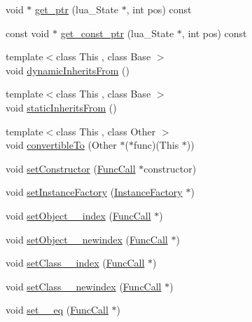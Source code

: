 \begin{DoxyCompactItemize}
\item 
void $\ast$ \hyperlink{classSLB_1_1ClassInfo_a820d5ddf3376aac189aaffbc62e8608d}{get\+\_\+ptr} (lua\+\_\+\+State $\ast$, int pos) const 
\item 
const void $\ast$ \hyperlink{classSLB_1_1ClassInfo_a569fd1f981d5980ea664aa5e0f895903}{get\+\_\+const\+\_\+ptr} (lua\+\_\+\+State $\ast$, int pos) const 
\item 
{\footnotesize template$<$class This , class Base $>$ }\\void \hyperlink{classSLB_1_1ClassInfo_af0d3da1b4fcccc58aa677ab8232fb6a9}{dynamic\+Inherits\+From} ()
\item 
{\footnotesize template$<$class This , class Base $>$ }\\void \hyperlink{classSLB_1_1ClassInfo_a1e58c3501ad023a5ebce26331b8a9814}{static\+Inherits\+From} ()
\item 
{\footnotesize template$<$class This , class Other $>$ }\\void \hyperlink{classSLB_1_1ClassInfo_aaf177c8a16edb1ec2067221d6eda8ee5}{convertible\+To} (Other $\ast$($\ast$func)(This $\ast$))
\item 
void \hyperlink{classSLB_1_1ClassInfo_a90af29ea5d67c7c479195fa90c715456}{set\+Constructor} (\hyperlink{classSLB_1_1FuncCall}{Func\+Call} $\ast$constructor)
\item 
void \hyperlink{classSLB_1_1ClassInfo_aeba124c3610bf38b1022c07a33e4dcd7}{set\+Instance\+Factory} (\hyperlink{structSLB_1_1InstanceFactory}{Instance\+Factory} $\ast$)
\item 
void \hyperlink{classSLB_1_1ClassInfo_a6a182b1a693f27330381a6951eff8c8a}{set\+Object\+\_\+\+\_\+index} (\hyperlink{classSLB_1_1FuncCall}{Func\+Call} $\ast$)
\item 
void \hyperlink{classSLB_1_1ClassInfo_a2bbc60f11b629b33b24f990842c12aec}{set\+Object\+\_\+\+\_\+newindex} (\hyperlink{classSLB_1_1FuncCall}{Func\+Call} $\ast$)
\item 
void \hyperlink{classSLB_1_1ClassInfo_a75f24c323122a169e8737b91ed1c8914}{set\+Class\+\_\+\+\_\+index} (\hyperlink{classSLB_1_1FuncCall}{Func\+Call} $\ast$)
\item 
void \hyperlink{classSLB_1_1ClassInfo_aa78c51a17b5d6a0098e0ad75b6ba701d}{set\+Class\+\_\+\+\_\+newindex} (\hyperlink{classSLB_1_1FuncCall}{Func\+Call} $\ast$)
\item 
void \hyperlink{classSLB_1_1ClassInfo_a9ad7fd3145856073e8cc9845811d6712}{set\+\_\+\+\_\+eq} (\hyperlink{classSLB_1_1FuncCall}{Func\+Call} $\ast$)
\item 

\end{DoxyCompactItemize}
